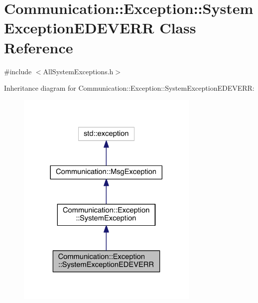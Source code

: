 \hypertarget{class_communication_1_1_exception_1_1_system_exception_e_d_e_v_e_r_r}{}\section{Communication\+:\+:Exception\+:\+:System\+Exception\+E\+D\+E\+V\+E\+R\+R Class Reference}
\label{class_communication_1_1_exception_1_1_system_exception_e_d_e_v_e_r_r}


{\ttfamily \#include $<$All\+System\+Exceptions.\+h$>$}



Inheritance diagram for Communication\+:\+:Exception\+:\+:System\+Exception\+E\+D\+E\+V\+E\+R\+R\+:\nopagebreak
\begin{figure}[H]
\begin{center}
\leavevmode
\includegraphics[width=248pt]{class_communication_1_1_exception_1_1_system_exception_e_d_e_v_e_r_r__inherit__graph}
\end{center}
\end{figure}


